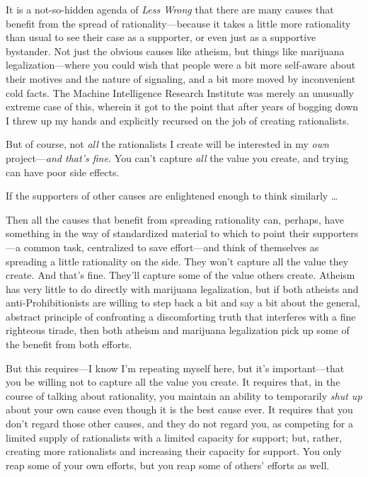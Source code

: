 {
 It is a not-so-hidden agenda of \textit{Less Wrong} that there are
many causes that benefit from the spread of rationality---because it
takes a little more rationality than usual to see their case as a
supporter, or even just as a supportive bystander. Not just the obvious
causes like atheism, but things like marijuana legalization---where you
could wish that people were a bit more self-aware about their motives
and the nature of signaling, and a bit more moved by inconvenient cold
facts. The Machine Intelligence Research Institute was merely an
unusually extreme case of this, wherein it got to the point that after
years of bogging down I threw up my hands and explicitly recursed on
the job of creating rationalists. }

{
 But of course, not \textit{all} the rationalists I create will be
interested in my \textit{own} project---\textit{and
that's fine.} You can't capture
\textit{all} the value you create, and trying can have poor side
effects.}

{
 If the supporters of other causes are enlightened enough to think
similarly \ldots}

{
 Then all the causes that benefit from spreading rationality can,
perhaps, have something in the way of standardized material to which to
point their supporters---a common task, centralized to save
effort---and think of themselves as spreading a little rationality on
the side. They won't capture all the value they create.
And that's fine. They'll capture some
of the value others create. Atheism has very little to do directly with
marijuana legalization, but if both atheists and anti-Prohibitionists
are willing to step back a bit and say a bit about the general,
abstract principle of confronting a discomforting truth that interferes
with a fine righteous tirade, then both atheism and marijuana
legalization pick up some of the benefit from both efforts.}

{
 But this requires---I know I'm repeating myself
here, but it's important---that you be willing not to
capture all the value you create. It requires that, in the course of
talking about rationality, you maintain an ability to temporarily
\textit{shut up} about your own cause even though it is the best cause
ever. It requires that you don't regard those other
causes, and they do not regard you, as competing for a limited supply
of rationalists with a limited capacity for support; but, rather,
creating more rationalists and increasing their capacity for support.
You only reap some of your own efforts, but you reap some of
others' efforts as well.}

